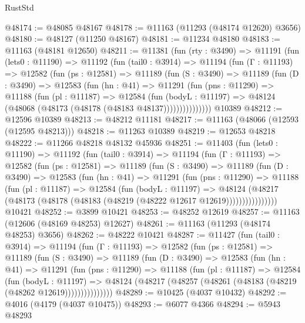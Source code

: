 \begin{lexlean}{RustStd}
\begin{coremodule}
@48174 := @48085 @48167
@48178 := @11163 (@11293 (@48174 @12620) @3656)
@48180 := @48127 (@11250 @48167)
@48181 := @11234 @48180
@48183 := @11163 (@48181 @12650)
@48211 := @11381
    (fun (rty : @3490) =>
    @11191
      (fun (lets0 : @11190) =>
      @11192
        (fun (tail0 : @3914) =>
        @11194
          (fun (Γ : @11193) =>
          @12582
            (fun (ps : @12581) =>
            @11189
              (fun (S : @3490) =>
              @11189
                (fun (D : @3490) =>
                @12583
                  (fun (hn : @41) =>
                  @11291
                    (fun (pns : @11290) =>
                    @11188
                      (fun (pl : @11187) =>
                      @12584
                        (fun (bodyL : @11197) =>
                        @48124 (@48068 (@48173 (@48178 (@48183 @48137)))))))))))))))
    @10389
@48212 := @12596 @10389
@48213 := @48212 @11181
@48217 := @11163 (@48066 (@12593 (@12595 @48213)))
@48218 := @11263 @10389
@48219 := @12653 @48218
@48222 := @11266 @48218 @48132 @45936
@48251 := @11403
    (fun (lets0 : @11190) =>
    @11192
      (fun (tail0 : @3914) =>
      @11194
        (fun (Γ : @11193) =>
        @12582
          (fun (ps : @12581) =>
          @11189
            (fun (S : @3490) =>
            @11189
              (fun (D : @3490) =>
              @12583
                (fun (hn : @41) =>
                @11291
                  (fun (pns : @11290) =>
                  @11188
                    (fun (pl : @11187) =>
                    @12584
                      (fun (bodyL : @11197) =>
                      @48124
                        (@48217
                          (@48173 (@48178 (@48183 (@48219 (@48222 @12617 @12619))))))))))))))))
    @10421
@48252 := @3899 @10421
@48253 := @48252 @12619
@48257 := @11163 (@12606 (@48169 @48253) @12627)
@48261 := @11163 (@11293 (@48174 @48253) @3656)
@48262 := @48222 @10421
@48287 := @11427
    (fun (tail0 : @3914) =>
    @11194
      (fun (Γ : @11193) =>
      @12582
        (fun (ps : @12581) =>
        @11189
          (fun (S : @3490) =>
          @11189
            (fun (D : @3490) =>
            @12583
              (fun (hn : @41) =>
              @11291
                (fun (pns : @11290) =>
                @11188
                  (fun (pl : @11187) =>
                  @12584
                    (fun (bodyL : @11197) =>
                    @48124 (@48217 (@48257 (@48261 (@48183 (@48219 (@48262 @12619)))))))))))))))
@48289 := @10425 (@4037 @10432)
@48292 := @4016 (@4179 (@4037 @10475))
@48293 := @6077 @4366
@48294 := @5943 @48293

\end{coremodule}
\end{lexlean}
